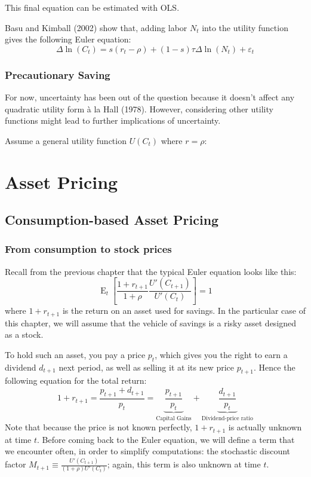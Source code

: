 \documentclass[12pt]{report}
\newcommand{\Et}[1]{\operatorname{E}_t\left[#1\right]}
\begin{document}
This final equation can be estimated with OLS.

Basu and Kimball (2002) show that, adding labor $N_t$ into the utility function gives the following Euler equation: $$ \Delta\ln (C_t) = s(r_t - \rho) + (1-s)\tau\Delta\ln (N_t) + \varepsilon_t $$

\subsection{Precautionary Saving}

For now, uncertainty has been out of the question because it doesn't affect any quadratic utility form à la Hall (1978). However, considering other utility functions might lead to further implications of uncertainty.

Assume a general utility function $U(C_t)$ where $r=\rho$:



\chapter{Asset Pricing}

\section{Consumption-based Asset Pricing}

\subsection{From consumption to stock prices}

Recall from the previous chapter that the typical Euler equation looks like this: $$\Et{\frac{1+r_{t+1}}{1+\rho} \frac{U'(C_{t+1})}{U'(C_t)}} = 1 $$ where $ 1 + r_{t+1}$ is the return on an asset used for savings. In the particular case of this chapter, we will assume that the vehicle of savings is a risky asset designed as a stock. 

To hold such an asset, you pay a price $p_t$, which gives you the right to earn a dividend $d_{t+1}$ next period, as well as selling it at its new price $p_{t+1}$. Hence the following equation for the total return: $$ 1 + r_{t+1} = \frac{p_{t+1} + d_{t+1}}{p_{t}} = \underbrace{\frac{p_{t+1}}{p_{t}}}_{\text{Capital Gains}} + \underbrace{\frac{d_{t+1}}{p_{t}}}_{\text{Dividend-price ratio}}$$ Note that because the price is not known perfectly, $1+r_{t+1}$ is actually unknown at time $t$. Before coming back to the Euler equation, we will define a term that we encounter often, in order to simplify computations: the stochastic discount factor $M_{t+1} \equiv \frac{U'(C_{t+1})}{(1+\rho)U'(C_t)}$; again, this term is also unknown at time $t$.
\end{document}
